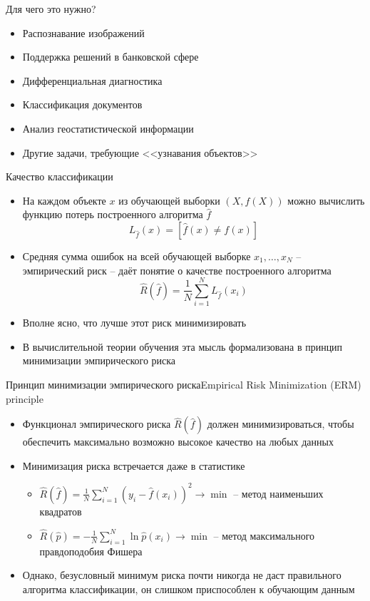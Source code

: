 \documentclass[red,unicode]{beamer}
\begin{document}
\begin{frame}{Для чего это нужно?}{}
\begin{itemize}
	\item Распознавание изображений
	\item Поддержка решений в банковской сфере
	\item Дифференциальная диагностика
	\item Классификация документов
	\item Анализ геостатистической информации
	\item Другие задачи, требующие <<узнавания объектов>>
\end{itemize}
\end{frame}


\begin{frame}{Качество классификации}
\begin{itemize}
	\item На каждом объекте $x$ из обучающей выборки $(X,f(X))$ можно вычислить функцию потерь построенного алгоритма $\hat f$
$$
L_{\hat f} (x) = [\hat f(x) \ne f(x)]
$$
	\item Средняя сумма ошибок на всей обучающей выборке $x_1, \dots, x_N$ -- эмпирический риск -- даёт понятие о качестве построенного алгоритма
$$
\hat R (\hat f) = \frac{1}{N} \sum_{i=1}^{N} L_{\hat f} (x_i)
$$
	\item Вполне ясно, что лучше этот риск минимизировать
	\item В вычислительной теории обучения эта мысль формализована в принцип минимизации эмпирического риска
\end{itemize}
\end{frame}

\begin{frame}{Принцип минимизации эмпирического риска}{Empirical Risk Minimization (ERM) principle}
\begin{itemize}
	\item Функционал эмпирического риска $\hat R(\hat f)$ должен минимизироваться, чтобы обеспечить максимально возможно высокое качество на любых данных
	\item Минимизация риска встречается даже в статистике
	\begin{itemize}
		\item $\hat R(\hat f) = \frac{1}{N} \sum_{i=1}^{N} (y_i - \hat f(x_i))^2 \to \min$   -- метод наименьших квадратов
		\item $\hat R(\hat p) = -\frac{1}{N} \sum_{i=1}^{N} \ln \hat p(x_i) \to \min$ -- метод максимального правдоподобия Фишера

	\end{itemize}
	\item Однако, безусловный минимум риска почти никогда не даст правильного алгоритма классификации, он слишком приспособлен к обучающим данным

\end{itemize}
\end{frame}
\end{document}

